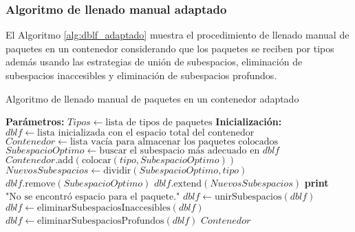 \subsubsection{Algoritmo de llenado manual adaptado}

El Algoritmo \ref{alg:dblf_adaptado} muestra el procedimiento de llenado manual de paquetes en un contenedor considerando que los paquetes se reciben por tipos además usando las estrategias de unión de subespacios, eliminación de subespacios inaccesibles y eliminación de subespacios profundos.

\begin{algorithm}[H]
    \caption{Algoritmo de llenado manual de paquetes en un contenedor adaptado}
    \label{alg:dblf_adaptado}
    \begin{algorithmic}[1]
        \State \textbf{Parámetros:} $Tipos \gets \text{lista de tipos de paquetes}$
        \State \textbf{Inicialización:} $dblf \gets \text{lista inicializada con el espacio total del contenedor}$
        \State $Contenedor \gets \text{lista vacía para almacenar los paquetes colocados}$
        \State $SubespacioOptimo \gets \text{buscar el subespacio más adecuado en } dblf$
        \State $Contenedor.\text{add}( \text{colocar}(tipo, SubespacioOptimo) )$
        \State $NuevosSubespacios \gets \text{dividir}(SubespacioOptimo, tipo)$
        \State $dblf.\text{remove}(SubespacioOptimo)$
        \State $dblf.\text{extend}(NuevosSubespacios)$
        \Else
        \State \textbf{print} $\text{"No se encontró espacio para el paquete."}$
        \EndIf
        \EndFor
        \State $dblf \gets \text{unirSubespacios}(dblf)$
        \State $dblf \gets \text{eliminarSubespaciosInaccesibles}(dblf)$
        \State $dblf \gets \text{eliminarSubespaciosProfundos}(dblf)$
        \EndFor
        \State \Return $Contenedor$
    \end{algorithmic}
\end{algorithm}

